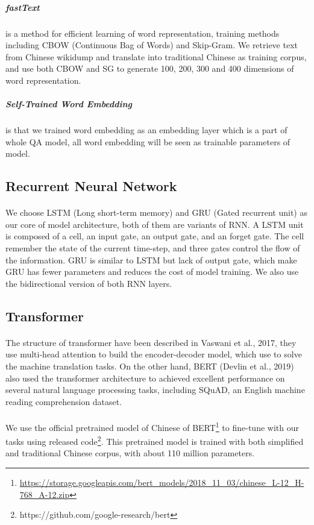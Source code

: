 \documentclass{article}
\begin{document}
\subparagraph{fastText} is a method for efficient learning of word representation, training methods including CBOW (Continuous Bag of Words) and Skip-Gram. We retrieve text from Chinese wikidump and translate into traditional Chinese as training corpus, and use both CBOW and SG to generate 100, 200, 300 and 400 dimensions of word representation.

\subparagraph{Self-Trained Word Embedding} is that we trained word embedding as an embedding layer which is a part of whole QA model, all word embedding will be seen as trainable parameters of model.

\subsection{Recurrent Neural Network}
\paragraph{}
We choose LSTM\cite{hochreiter1997lstm} (Long short-term memory) and GRU\cite{cho2014learning} (Gated recurrent unit) as our core of model architecture, both of them are variants of RNN. A LSTM unit is composed of a cell, an input gate, an output gate, and an forget gate. The cell remember the state of the current time-step, and three gates control the flow of the information. GRU is similar to LSTM but lack of output gate, which make GRU has fewer parameters and reduces the cost of model training. We also use the bidirectional version of both RNN layers.

\subsection{Transformer}
\paragraph{}
The structure of transformer\cite{vaswani2017attention} have been described in Vaswani et al., 2017, they use multi-head attention to build the encoder-decoder model, which use to solve the machine translation tasks. On the other hand, BERT\cite{devlin2018bert} (Devlin et al., 2019) also used the transformer architecture to achieved excellent performance on several natural language processing tasks, including SQuAD, an English machine reading comprehension dataset.

\paragraph{}
We use the official pretrained model of Chinese of BERT\footnote{\url{https://storage.googleapis.com/bert_models/2018_11_03/chinese_L-12_H-768_A-12.zip}} to fine-tune with our tasks using released code\footnote{\label{run_squad}https://github.com/google-research/bert}. This pretrained model is trained with both simplified and traditional Chinese corpus, with about 110 million parameters.
\end{document}
